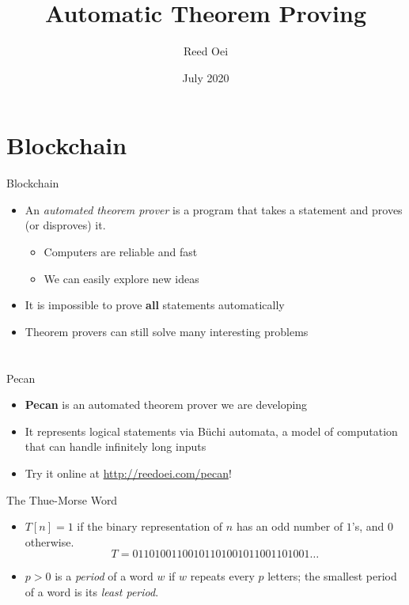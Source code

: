 \documentclass[leqno,presentation,usenames,dvipsnames]{beamer}
\title{Automatic Theorem Proving}
\author[names]{Reed Oei}
\institute{%
    University of Illinois at Urbana-Champaign
}
\date{July 2020}
\begin{document}
\frame{\titlepage}

\section{Blockchain}

\begin{frame}{Blockchain}
    \begin{itemize}
        \item An \emph{automated theorem prover} is a program that takes a statement and proves (or disproves) it.
            \begin{itemize}
                \item Computers are reliable and fast
                \item We can easily explore new ideas
            \end{itemize}

        \item It is impossible to prove \textbf{all} statements automatically

        \item Theorem provers can still solve many interesting problems
    \end{itemize}
\end{frame}

\section{\langName}

\begin{frame}[fragile]{Pecan}
\begin{itemize}
    \item \textbf{Pecan} is an automated theorem prover we are developing
    \item It represents logical statements via B\"uchi automata, a model of computation that can handle infinitely long inputs
    \item Try it online at \url{http://reedoei.com/pecan}!
\end{itemize}
\end{frame}

\begin{frame}[fragile]{The Thue-Morse Word}
    \begin{itemize}
        \item $T[n] = 1$ if the binary representation of $n$ has an odd number of $1$'s, and $0$ otherwise.
        \[
            T = 01101001100101101001011001101001\ldots
        \]

        \item $p > 0$ is a \emph{period} of a word $w$ if $w$ repeats every $p$ letters; the smallest period of a word is its \emph{least period}.

    \end{itemize}

\end{frame}
\end{document}
